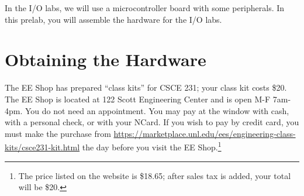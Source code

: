 

\usepackage{enumitem}
\usepackage{graphicx}
\usepackage{addfont}
\usepackage[normalem]{ulem}
\usepackage{subfig}
\usepackage{wrapfig}
\usepackage{animate}
\usepackage{multicol}

\renewcommand{\labnumber}{9-prelab}
\renewcommand{\labname}{Physical Assembly of Hardware for I/O Labs}
\renewcommand{\shortlabname}{i/o-prelab}
\renewcommand{\collaborationrules}{\freecollaboration}
\renewcommand{\duedate}{Before the start of your lab section on November 3, 8, or 9}

\newcommand{\nano}{Arduino Nano}
\newcommand{\power}{{power~(\color{red}\bf+}) rail}
\newcommand{\ground}{ground~({\color{RoyalBlue}\bf--}) rail}
\newcommand{\checkpoint}[1]{\stepcounter{checkpoint}\vspace{1cm}
\textbf{\textsc{CheckPoint}~\thecheckpoint:} Before proceeding further, have a
TA or a classmate verify that you have correctly #1. Update
\textit{checkpoints.txt} file to indicate who checked your work and when they
did so.\vspace{1cm}}
\newcommand{\disconnect}{\textbf{Before proceeding further, disconnect the USB
cable from the \nano.}}
\newcommand{\rainbow}{male-to-male rainbow cable}

\startdocument


In the I/O labs, we will use a microcontroller board with some peripherals. In
this prelab, you will assemble the hardware for the I/O labs.

\section{Obtaining the Hardware}

The EE Shop has prepared ``class kits'' for CSCE 231; your class kit costs \$20.
The EE Shop is located at 122 Scott Engineering Center and is open M-F 7am-4pm.
You do not need an appointment. You may pay at the window with cash, with a
personal check, or with your NCard. If you wish to pay by credit card, you must
make the purchase from
\url{https://marketplace.unl.edu/ees/engineering-class-kits/csce231-kit.html}
the day before you visit the EE Shop.\footnote{The price listed on the website
is \$18.65; after sales tax is added, your total will be \$20.}

